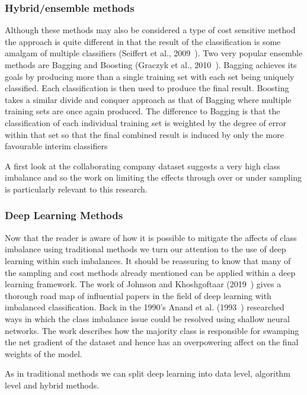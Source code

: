 

\subsubsection{Hybrid/ensemble methods}
Although these methods may also be considered a type of cost sensitive method the approach is quite different in that the result of the classification is some amalgam of multiple classifiers (Seiffert et al., 2009~\cite{seiffert2009rusboost}). Two very popular ensemble methods are Bagging and Boosting (Graczyk et al., 2010~\cite{graczyk2010comparison}). Bagging achieves its goals by producing more than a single training set with each set being uniquely classified. Each classification is then used to produce the final result. Boosting takes a similar divide and conquer approach as that of Bagging where multiple training sets are once again produced. The difference to Bagging is that the classification of each individual training set is weighted by the degree of error within that set so that the final combined result is induced by only the more favourable interim classifiers
\par


\par

\noindent
A first look at the collaborating company dataset suggests a very high class imbalance and so the work on limiting the effects through over or under sampling is particularly relevant to this research.

\subsubsection{Deep Learning Methods} \label{sec:Deep}
Now that the reader is aware of how it is possible to mitigate the affects of class imbalance using traditional methods we turn our attention to the use of deep learning within such imbalances. It should be reassuring to know that many of the sampling and cost methods already mentioned can be applied within a deep learning framework.
The work of Johnson and Khoshgoftaar (2019~\cite{johnson2019survey}) gives a thorough road map of influential papers in the field of deep learning with imbalanced classification.
Back in the 1990's Anand et al. (1993~\cite{anand1993improved}) researched ways in which the class imbalance issue could be resolved using shallow neural networks. The work describes how the majority class is responsible for swamping the net gradient of the dataset and hence has an overpowering affect on the final weights of the model.
\par
As in traditional methods we can split deep learning into data level, algorithm level and hybrid methods.
\par
